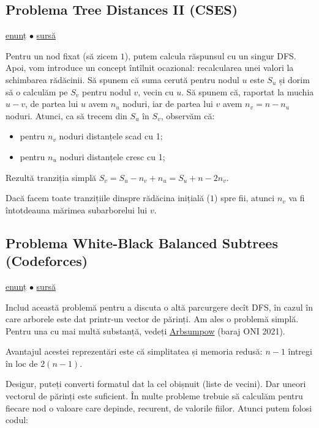\documentclass[../main.tex]{subfiles}
\begin{document}
\subsection{Problema Tree Distances II (CSES)}
\label{problem:tree-distances-2}

\href{https://cses.fi/problemset/task/1133}{enunț}
$\bullet$
\hyperref[code:tree-distances-2]{sursă}

Pentru un nod fixat (să zicem $1$), putem calcula răspunsul cu un singur DFS. Apoi, vom introduce un concept întîlnit ocazional: recalcularea unei valori la schimbarea rădăcinii. Să spunem că suma cerută pentru nodul $u$ este $S_u$ și dorim să o calculăm pe $S_v$ pentru nodul $v$, vecin cu $u$. Să spunem că, raportat la muchia $u-v$, de partea lui $u$ avem $n_u$ noduri, iar de partea lui $v$ avem $n_v = n - n_u$ noduri. Atunci, ca să trecem din $S_u$ în $S_v$, observăm că:

\begin{itemize}
  \item pentru $n_v$ noduri distanțele scad cu 1;
  \item pentru $n_u$ noduri distanțele cresc cu 1;
\end{itemize}

Rezultă tranziția simplă $S_v = S_u - n_v + n_u = S_u + n - 2 n_v$.

Dacă facem toate tranzițiile dinspre rădăcina inițială ($1$) spre fii, atunci $n_v$ va fi întotdeauna mărimea subarborelui lui $v$.

\subsection{Problema White-Black Balanced Subtrees (Codeforces)}
\label{problem:white-black-balanced-subtrees}

\href{https://codeforces.com/contest/1676/problem/G}{enunț}
$\bullet$
\hyperref[code:white-black-balanced-subtrees]{sursă}

Includ această problemă pentru a discuta o altă parcurgere decît DFS, în cazul în care arborele este dat printr-un vector de părinți. Am ales o problemă simplă. Pentru una cu mai multă substanță, vedeți \href{https://kilonova.ro/problems/67}{Arbsumpow} (baraj ONI 2021).

Avantajul acestei reprezentări este că simplitatea și memoria redusă: $n-1$ întregi în loc de $2(n-1)$.

Desigur, puteți converti formatul dat la cel obișnuit (liste de vecini). Dar uneori vectorul de părinți este suficient. În multe probleme trebuie să calculăm pentru fiecare nod o valoare care depinde, recurent, de valorile fiilor. Atunci putem folosi codul:
\end{document}

